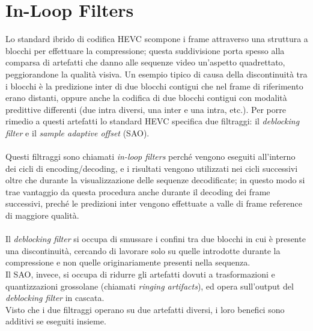 \section{In-Loop Filters}
Lo standard ibrido di codifica HEVC scompone i frame attraverso una struttura a 
blocchi per effettuare la compressione; questa suddivisione porta spesso alla 
comparsa di artefatti che danno alle sequenze video un'aspetto quadrettato, 
peggiorandone la qualità visiva. Un esempio tipico di causa della discontinuità 
tra i blocchi è la predizione inter di due blocchi contigui che nel frame
 di riferimento erano distanti, oppure anche la codifica di due blocchi contigui
 con modalità predittive differenti (due intra diversi, una inter e una intra, 
etc.). Per porre rimedio a questi artefatti lo standard HEVC specifica due 
filtraggi: il \emph{deblocking filter} e il \emph{sample adaptive offset} (SAO).
\\ \\
Questi filtraggi sono chiamati \emph{in-loop filters} perché vengono eseguiti 
all'interno dei cicli di encoding/decoding, e i risultati vengono utilizzati 
nei cicli successivi oltre che durante la visualizzazione delle sequenze 
decodificate; in questo modo si trae vantaggio da questa procedura anche durante
 il decoding dei frame successivi, preché le predizioni inter vengono effettuate
 a valle di frame reference di maggiore qualità.
\\ \\
Il \emph{deblocking filter} si occupa di smussare i confini tra due blocchi in 
cui è presente una discontinuità, cercando di lavorare solo su quelle 
introdotte durante la compressione e non quelle originariamente presenti nella 
sequenza. \\
Il SAO, invece, si occupa di ridurre gli artefatti dovuti a trasformazioni e 
quantizzazioni grossolane (chiamati \emph{ringing artifacts}), ed opera 
sull'output del \emph{deblocking filter} in cascata. \\
Visto che i due filtraggi operano su due artefatti diversi, i loro benefici 
sono additivi se eseguiti insieme.


